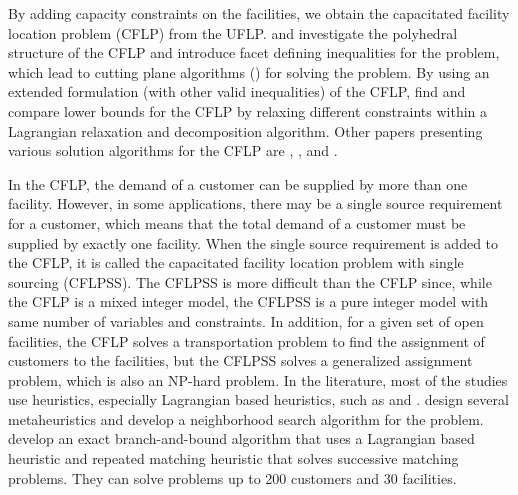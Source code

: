 
By adding capacity constraints on the facilities, we obtain the capacitated 
facility location problem (CFLP) from the UFLP.   \citet{Leung} and \citet{Aardal}  
investigate the polyhedral structure of the CFLP and introduce facet defining 
inequalities for the problem, which lead to cutting plane algorithms 
(\citet{Aardal2}) for solving the problem. By using an extended formulation 
(with other valid inequalities) of the CFLP, \citet{Cornuejols} find and compare 
lower bounds for the CFLP by relaxing different constraints within a Lagrangian 
relaxation and decomposition algorithm. Other papers presenting various solution 
algorithms for the CFLP are \citet{Baker}, \citet{VanRoy}, \citet{Pirkul} and 
\citet{Beasley2}. 

In the CFLP, the demand of a customer can be supplied by more than one 
facility. However, in some applications, there may be a single source requirement 
for a customer, which means that the total demand of a customer must be supplied 
by exactly one facility. When the single source requirement is added to the CFLP, 
it is called the capacitated facility location problem with single sourcing 
(CFLPSS). The CFLPSS is more difficult than the CFLP since, while the CFLP is a 
mixed integer model, the CFLPSS is a pure integer model with same number of
variables and constraints. In addition, for a given set of open facilities, 
the CFLP solves a transportation problem to find the assignment of customers to 
the facilities, but the CFLPSS solves a generalized assignment problem, which is 
also an NP-hard problem. In the literature, most of the studies use heuristics, 
especially Lagrangian based heuristics, such as \citet{Klincewicz} and 
\citet{Sridharan}. \citet{Delmaire} design several metaheuristics and 
\citet{Ahuja04} develop a neighborhood search algorithm for the problem.
\citet{Holmberg} develop an exact branch-and-bound algorithm that uses a  
Lagrangian based heuristic and repeated matching heuristic that solves 
successive matching problems. They can solve problems up to 
200 customers and 30 facilities. 



